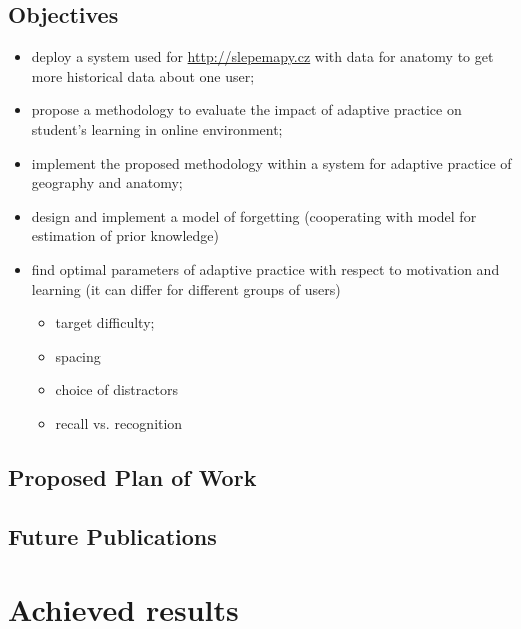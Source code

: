 \documentclass[table,color]{fithesis3/fithesis3}
\begin{document}
\section{Objectives}

\begin{itemize}
	\item deploy a system used for \url{http://slepemapy.cz} with data for
		anatomy to get more historical data about one user;
	\item propose a methodology to evaluate the impact of adaptive practice on
		student's learning in online environment;
	\item implement the proposed methodology within a system for adaptive
		practice of geography and anatomy;
	\item design and implement a model of forgetting (cooperating with model for
		estimation of prior knowledge)
	\item find optimal parameters of adaptive practice with respect to motivation
		and learning (it can differ for different groups of users)
		\begin{itemize}
			\item target difficulty;
			\item spacing
			\item choice of distractors
			\item recall vs. recognition
		\end{itemize}
\end{itemize}

\section{Proposed Plan of Work}

\section{Future Publications}

\chapter{Achieved results}



\end{document}
